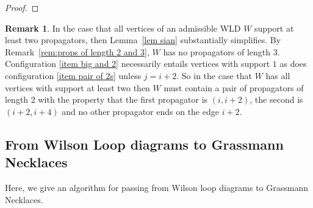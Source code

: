 \documentclass[11pt]{article}
\theoremstyle{remark}
\theoremstyle{definition}
\newtheorem{rmk}[thm]{Remark}
\begin{document}
\begin{proof}
%
%
%
%
%
%
%
%
%
%
%
%
\end{proof}

\begin{rmk}
In the case that all vertices of an admissible WLD $W$ support at least two propagators, then Lemma~\ref{lem sian} substantially simplifies.  By Remark~\ref{rem:props of length 2 and 3}, $W$ has no propagators of length $3$.  Configuration \ref{item big and 2} necessarily entails vertices with support $1$ as does configuration \ref{item pair of 2s} unless $j=i+2$.  So in the case that $W$ has all vertices with support at least two then $W$ must contain a pair of propagators of length $2$  with the property that the first propagator is $(i, i+2)$, the second is $(i+2, i+4)$ and no other propagator ends on the edge $i+2$.
\end{rmk}


\subsection{From Wilson Loop diagrams to Grassmann Necklaces}

Here, we give an algorithm for passing from Wilson loop diagrams to Grassmann Necklaces.
\end{document}
